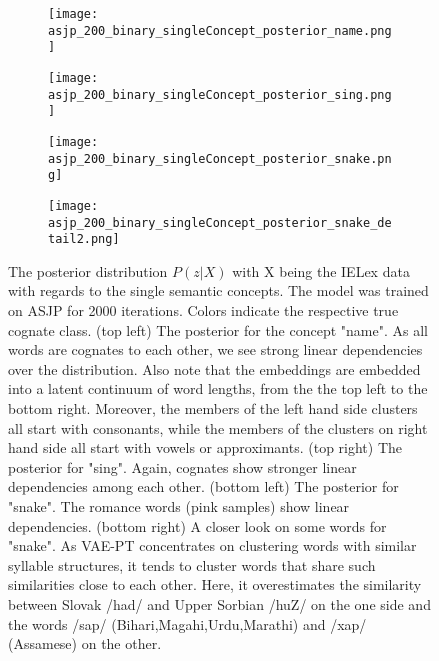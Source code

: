 \documentclass[6pt]{article}
\begin{document}
 \begin{figure}[ht] 
  \begin{subfigure}[b]{0.5\linewidth}
    \centering
    \texttt{[image: asjp\_200\_binary\_singleConcept\_posterior\_name.png]} 
    \label{fig:vae_phono_orthofeatures0} 
    \vspace{4ex}
  \end{subfigure}%
  \begin{subfigure}[b]{0.5\linewidth}
    \centering
    \texttt{[image: asjp\_200\_binary\_singleConcept\_posterior\_sing.png]} 
    \label{fig:vae_phono_orthofeatures1} 
    \vspace{4ex}
  \end{subfigure} 
  \begin{subfigure}[b]{0.5\linewidth}
    \centering
    \texttt{[image: asjp\_200\_binary\_singleConcept\_posterior\_snake.png]} 
    \label{fig:vae_phono_orthofeatures2} 
  \end{subfigure}%
  \begin{subfigure}[b]{0.5\linewidth}
    \centering
    \texttt{[image: asjp\_200\_binary\_singleConcept\_posterior\_snake\_detail2.png]} 
    \label{fig:vae_phono_orthofeatures3} 
  \end{subfigure} 
  \caption{The posterior distribution $P(z|X)$ with X being the IELex data with regards to the single semantic concepts. The model was trained on ASJP for 2000 iterations. Colors indicate the respective true cognate class. (top left) The posterior for the concept "name". As all words are cognates to each other, we see strong linear dependencies over the distribution. Also note that the embeddings are embedded into a latent continuum of word lengths, from the the top left to the bottom right. Moreover, the members of the left hand side clusters all start with consonants, while the members of the clusters on right hand side all start with vowels or approximants. (top right) The posterior for "sing". Again, cognates show stronger linear dependencies among each other. (bottom left) The posterior for "snake". The romance words (pink samples) show linear dependencies. (bottom right) A closer look on some words for "snake". As VAE-PT concentrates on clustering words with similar syllable structures, it tends to cluster words that share such similarities close to each other. Here, it overestimates the similarity between Slovak /had/ and Upper Sorbian /huZ/ on the one side and the words /sap/ (Bihari,Magahi,Urdu,Marathi) and /xap/ (Assamese) on the other.  }
  \label{fig:asjp_2000_binary_singleIELEXConcepts_posteriors} 
\end{figure}
\end{document}
